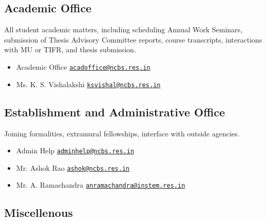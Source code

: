 \documentclass[a4paper,10pt]{article}
\newcommand\MAILTO[2]{#1 \Letter\; \href{mailto:#2}{\nolinkurl{#2}}}
\begin{document}
\subsection{Academic Office} 
All student academic matters, including scheduling
Annual Work Seminars, submission of Thesis Advisory Committee reports, course
transcripts, interactions with MU or TIFR, and thesis submission.

\begin{itemize}
    \item \MAILTO{Academic Office}{acadoffice@ncbs.res.in} 
    \item \MAILTO{Ms. K. S. Vishalakshi}{ksvishal@ncbs.res.in}
\end{itemize}

\subsection{Establishment and Administrative Office}
Joining formalities, extramural fellowships, interface with outside agencies.

\begin{itemize}
    \item \MAILTO{Admin Help}{adminhelp@ncbs.res.in}
    \item \MAILTO{Mr. Ashok Rao}{ashok@ncbs.res.in}
    \item \MAILTO{Mr. A. Ramachandra}{anramachandra@instem.res.in}
\end{itemize}

\subsection{Miscellenous}
\end{document}
